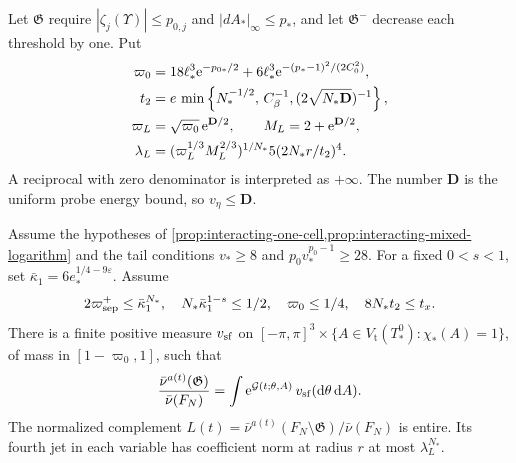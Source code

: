 Let $\mathfrak G$ require
$|\zeta_j(\Upsilon)|\le p_{0,j}$
and $|dA_*|_\infty\le p_*$, and let
$\mathfrak G^-$ decrease each threshold by one.
Put
\begin{align}
 \varpi_0&=18\ell_*^3\mathrm e^{-p_{0*}/2}
               +6\ell_*^3\mathrm e^{-(p_*-1)^2/(2C_0^2)},\notag\\
 t_2&=e\,\min\left\{N_*^{-1/2},\,C_\beta^{-1},
                                     (2\sqrt{N_*\mathbf D})^{-1}\right\},\notag\\
 \varpi_L&=\sqrt{\varpi_0}\,\mathrm e^{\mathbf D/2},
 \qquad M_L=2+\mathrm e^{\mathbf D/2},\notag\\
 \lambda_L&=(\varpi_L^{1/3}M_L^{2/3})^{1/N_*}
                              5(2N_*r/t_2)^4 .
                                     \label{eq:interacting-complement-constants}
\end{align}
A reciprocal with zero denominator is interpreted
as $+\infty$. The number $\mathbf D$ is the
uniform probe energy bound, so $v_\eta\le\mathbf D$.

\begin{proposition}\label{prop:interacting-complement}
Assume the hypotheses of \cref{prop:interacting-one-cell,prop:interacting-mixed-logarithm}
and the tail conditions $v_*\ge8$ and $p_0v_*^{p_0-1}\ge28$.
For a fixed $0<s<1$, set
$\bar\kappa_1=6e_*^{1/4-9\varepsilon}$.
Assume
\begin{equation}\label{eq:interacting-jet-conditions}
 2\varpi_{\rm sep}^+\le\bar\kappa_1^{N_*},\quad
 N_*\bar\kappa_1^{1-s}\le1/2,\quad
 \varpi_0\le1/4,\quad 8N_*t_2\le t_x .
\end{equation}
There is a finite positive measure $v_{\rm sf}$
on $[-\pi,\pi]^3\times\{A\in V_{\mathrm t}(T_*^0):\chi_*(A)=1\}$, of
mass in $[1-\varpi_0,1]$, such that
\begin{equation}\label{eq:interacting-small-field-representation}
 \frac{\bar\nu^{a(t)}(\mathfrak G)}{\bar\nu(F_N)}
       =\int \mathrm e^{\mathcal G(t;\theta,A)}\,v_{\rm sf}(\mathrm d\theta\,\mathrm d A).
\end{equation}
The normalized complement
$L(t)=\bar\nu^{a(t)}(F_N\setminus\mathfrak G)/\bar\nu(F_N)$
is entire. Its fourth jet in each variable has
coefficient norm at radius $r$ at most
$\lambda_L^{N_*}$.
\end{proposition}

